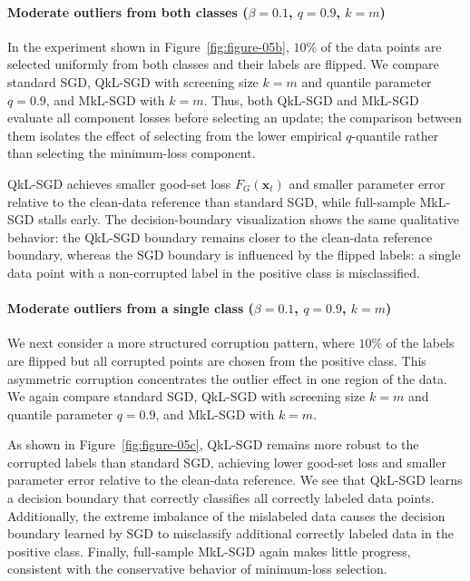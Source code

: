 \documentclass[11pt]{article}
\newcommand{\ve}[1]{\mathbf{#1}}
\begin{document}
\paragraph{Moderate outliers from both classes
(\texorpdfstring{$\beta=0.1$, $q=0.9$, $k=m$}
{beta=0.1, q=0.9, k=m})}
In the experiment shown in Figure~\ref{fig:figure-05b},
$10\%$ of the data points are selected uniformly from both classes and their
labels are flipped. We compare standard SGD, QkL-SGD with screening size
$k=m$ and quantile parameter $q=0.9$, and MkL-SGD with $k=m$. Thus, both
QkL-SGD and MkL-SGD evaluate all component losses before selecting an update;
the comparison between them isolates the effect of selecting from the lower
empirical $q$-quantile rather than selecting the minimum-loss component.

QkL-SGD achieves smaller good-set loss $F_G(\ve x_t)$ and smaller parameter
error relative to the clean-data reference than standard SGD, while full-sample
MkL-SGD stalls early. The decision-boundary visualization shows the same
qualitative behavior: the QkL-SGD boundary remains closer to the clean-data
reference boundary, whereas the SGD boundary is influenced by the
flipped labels: a single data point with a non-corrupted label in the positive class is misclassified.


\paragraph{Moderate outliers from a single class
(\texorpdfstring{$\beta=0.1$, $q=0.9$, $k=m$}
{beta=0.1, q=0.9, k=m})}
We next consider a more structured corruption pattern, where $10\%$ of the
labels are flipped but all corrupted points are chosen from the positive
class. This asymmetric corruption concentrates the outlier effect in one
region of the data. We again compare standard SGD, QkL-SGD with screening
size $k=m$ and quantile parameter $q=0.9$, and MkL-SGD with $k=m$.


As shown in Figure~\ref{fig:figure-05c}, QkL-SGD remains more
robust to the corrupted labels than standard SGD, achieving lower good-set loss and smaller parameter error relative to the clean-data reference. We see that QkL-SGD learns a decision boundary that correctly classifies all correctly labeled data points.  Additionally, the extreme imbalance of the mislabeled data causes the decision boundary learned by SGD to misclassify additional correctly labeled data in the positive class. Finally, full-sample MkL-SGD again makes
little progress, consistent with the conservative behavior of minimum-loss selection.
\end{document}
